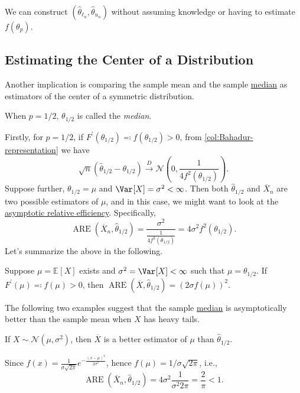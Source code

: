\begin{remark}
	We can construct \((\hat{\theta} _{\ell _n}, \hat{\theta} _{u_n})\) without assuming knowledge or having to estimate \(f(\theta _p)\).
\end{remark}

\subsection{Estimating the Center of a Distribution}
Another implication is comparing the sample mean and the sample \hyperref[def:median]{median} as estimators of the center of a symmetric distribution.

\begin{definition}[Median]\label{def:median}
	When \(p = 1 / 2\), \(\theta _{1 / 2}\) is called the \emph{median}.
\end{definition}

Firstly, for \(p = 1 / 2\), if \(F^{\prime} (\theta _{1 / 2}) \eqqcolon f(\theta _{1 / 2}) > 0\), from \autoref{col:Bahadur-representation} we have
\[
	\sqrt{n} (\hat{\theta} _{1 / 2} - \theta _{1 / 2})
	\overset{D}{\to} \mathcal{N} \left( 0, \frac{1}{4 f^2(\theta _{1 / 2})} \right) .
\]
Suppose further, \(\theta _{1 / 2} = \mu \) and \(\Var_{}[X] = \sigma ^2 < \infty \). Then both \(\hat{\theta} _{1 / 2}\) and \(\overline{X} _n\) are two possible estimators of \(\mu \), and in this case, we might want to look at the \hyperref[def:asymptotic-relative-efficiency]{asymptotic relative efficiency}. Specifically,
\[
	\operatorname{ARE}(\overline{X} _n , \hat{\theta} _{1 / 2})
	= \frac{\sigma ^2}{\frac{1}{4 f^2(\theta _{1 / 2})}}
	= 4 \sigma ^2 f^2(\theta _{1 / 2}).
\]
Let's summarize the above in the following.

\begin{proposition}\label{prop:sample-quantile-ARE}
	Suppose \(\mu = \mathbb{E}_{}[X] \) exists and \(\sigma ^2 = \Var_{}[X] < \infty \) such that \(\mu = \theta _{1 / 2}\). If \(F^{\prime} (\mu ) \eqqcolon f(\mu ) > 0\), then \(\operatorname{ARE}(\overline{X} , \hat{\theta} _{1 / 2}) = (2 \sigma f(\mu ))^2\).
\end{proposition}

The following two examples suggest that the sample \hyperref[def:median]{median} is asymptotically better than the sample mean when \(X\) has heavy tails.

\begin{eg}
	If \(X \sim \mathcal{N} (\mu , \sigma ^2)\), then \(\overline{X} \) is a better estimator of \(\mu \) than \(\hat{\theta} _{1 / 2}\).
\end{eg}
\begin{explanation}
	Since \(f(x) = \frac{1}{\sigma \sqrt{2\pi } } e^{- \frac{(x - \mu )^2}{2 \sigma ^2}}\), hence \(f(\mu ) = 1 / \sigma \sqrt{2\pi } \), i.e.,
	\[
		\operatorname{ARE}(\overline{X} _n, \hat{\theta} _{1 / 2})
		= 4 \sigma ^2 \frac{1}{\sigma ^2 2\pi }
		= \frac{2}{\pi }
		< 1.
	\]
\end{explanation}

